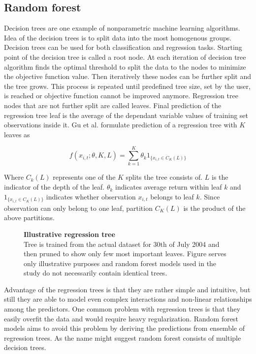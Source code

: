 \documentclass{article}
\begin{document}
\subsection{Random forest}

Decision trees are one example of nonparametric machine learning algorithms. Idea of the decision trees is to split data into the most homogenous groups. Decision trees can be used for both classification and regression tasks. Starting point of the decision tree is called a root node. At each iteration of decision tree algorithm finds the optimal threshold to split the data to the nodes to minimize the objective function value. Then iteratively these nodes can be further split and the tree grows. This process is repeated until predefined tree size, set by the user, is reached or objective function cannot be improved anymore. Regression tree nodes that are not further split are called leaves. Final prediction of the regression tree leaf is the average of the dependant variable values of training set observations inside it. Gu et al. \citeyear{guetal} formulate prediction of a regression tree with $K$ leaves as \par

\begin{equation}
f(x_{i, t}; \theta, K, L) = \sum_{k=1}^K \theta_k 1 _{\{x_{i, t} \in C_K(L)\}}
\end{equation}

Where $C_k(L)$ represents one of the $K$ splits the tree consists of. $L$ is the indicator of the depth of the leaf. $\theta_k$ indicates average return within leaf $k$ and $1 _{\{x_{i, t} \in C_K(L)\}}$ indicates whether observation $x_{i, t}$ belongs to leaf $k$. Since observation can only belong to one leaf, partition $C_K(L)$ is the product of the above partitions. \par

\begin{figure}[ht]
\centering
\caption[Illustrative regression tree]{\textbf{Illustrative regression tree}\\ Tree is trained from the actual dataset for 30th of July 2004 and then pruned to show only few most important leaves. Figure serves only illustrative purposes and random forest models used in the study do not necessarily contain identical trees. }

\label{plot:regre_tree}
\end{figure}

Advantage of the regression trees is that they are rather simple and intuitive, but still they are able to model even complex interactions and non-linear relationships among the predictors. One common problem with regression trees is that they easily overfit the data and would require heavy regularization. Random forest models aims to avoid this problem by deriving the predictions from ensemble of regression trees. As the name might suggest random forest consists of multiple decision trees. \par
\end{document}
